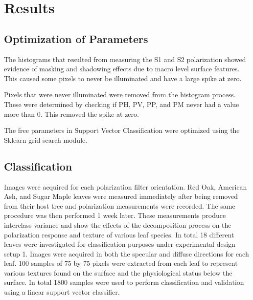\chapter{Results}
%

\section{Optimization of Parameters}
The histograms that resulted from measuring the S1 and S2 polarization showed evidence of masking and shadowing effects due to macro level surface features.  This caused some pixels to never be illuminated and have a large spike at zero.

Pixels that were never illuminated were removed from the histogram process. These were determined by checking if PH, PV, PP, and PM never had a value more than 0.  This removed the spike at zero.

The free parameters in Support Vector Classification were optimized using the Sklearn grid search module.

\section{Classification}
Images were acquired for each polarization filter orientation. Red Oak, American Ash, and Sugar Maple leaves were measured immediately after being removed from their host tree and polarization measurements were recorded.  The same procedure was then performed 1 week later.  These measurements produce interclass variance and show the effects of the decomposition process on the polarization response and texture of various leaf species.  In total 18 different leaves were investigated for classification purposes under experimental design setup 1.  Images were acquired in both the specular and diffuse directions for each leaf.  100 samples of 75 by 75 pixels were extracted from each leaf to represent various textures found on the surface and the physiological status below the surface.  In total 1800 samples were used to perform classification and validation using a linear support vector classifier.
